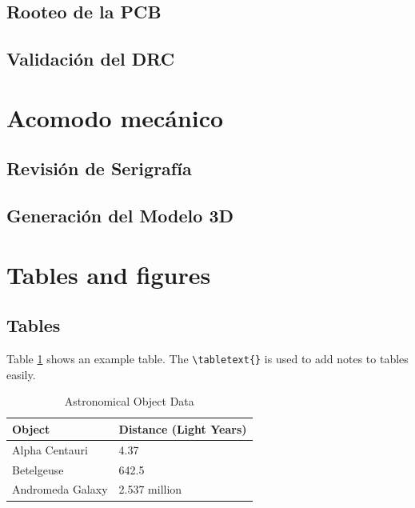 \documentclass[9pt,a4paper,twocolumn,twoside]{tau-class/tau}
\begin{document}
\subsection{Rooteo de la PCB}

\subsection{Validación del DRC}

\section{Acomodo mecánico}

\subsection{Revisión de Serigrafía}

\subsection{Generación del Modelo 3D}

		
\section{Tables and figures}

    \subsection{Tables}
	
        Table \ref{tab:table} shows an example table. The \verb|\tabletext{}| is used to add notes to tables easily. 
    		
        \begin{table}[H]
            \centering
            \caption{Astronomical Object Data}
            \label{tab:table}
            \begin{tabular}{ll}
                \toprule
                \textbf{Object} & \textbf{Distance (Light Years)} \\
                \midrule
                Alpha Centauri & 4.37 \\
                Betelgeuse & 642.5 \\
                Andromeda Galaxy & 2.537 million \\
                \bottomrule   
            \end{tabular}
			
			
        \end{table}
\end{document}
